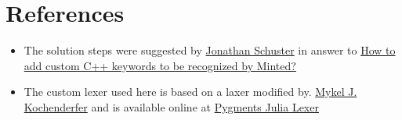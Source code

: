 \documentclass[a4paper,11pt]{scrartcl}
\begin{document}
\section{References}
\begin{itemize}
	\item The solution steps  were suggested by 
	\href{https://tex.stackexchange.com/users/11030/jonathan-schuster}{Jonathan Schuster} in answer to  \href{https://tex.stackexchange.com/questions/18083/how-to-add-custom-c-keywords-to-be-recognized-by-minted#comment930474_42392}{How to add custom C++ keywords to be recognized by Minted?}
	\item  The custom lexer used here is based on a laxer  modified by. \href{https://mykel.kochenderfer.com/}{Mykel J. Kochenderfer} and is available online  at \href{https://github.com/sisl/pygments-julia/tree/f2d897ceb5d66fa83fb1870ac047ff19987acc88}{Pygments Julia Lexer}
\end{itemize}
\end{document}
